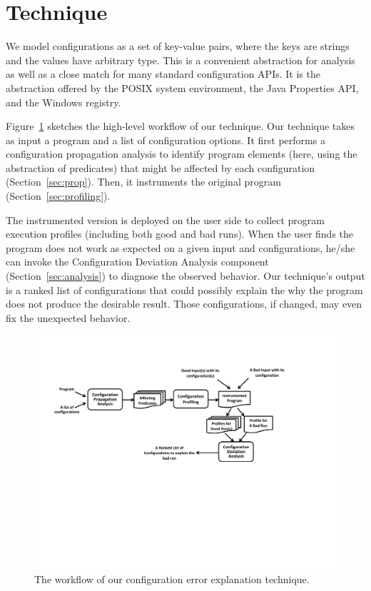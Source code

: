 \section{Technique}
\label{sec:technique}

We model configurations as a set of key-value pairs, where
the keys are strings and the values have arbitrary type. This is a
convenient abstraction for analysis as well as a close match for
many standard configuration APIs. It is the abstraction offered
by the POSIX system environment, the Java Properties API,
and the Windows registry.


Figure~\ref{fig:workflow} sketches the high-level workflow of our technique.
Our technique takes as input a program and a list of configuration options.
It first performs a configuration propagation analysis to identify
program elements (here, using the abstraction of predicates) that might be
affected by each configuration (Section~\ref{sec:prop}). Then, it
instruments the original program (Section~\ref{sec:profiling}).

The instrumented version is deployed on the user side to collect program execution
profiles (including both good and bad runs). When the user finds the program
does not work as expected on a given input and configurations,
he/she can invoke the Configuration Deviation Analysis component (Section~\ref{sec:analysis}) to
diagnose the observed behavior. Our technique's output is a ranked list of
configurations that could possibly explain the why the program does not produce the desirable result. Those
configurations, if changed, may even fix the unexpected behavior.

\begin{figure}[!]
  \centering
  \includegraphics[scale=0.750]{workflow}
  \vspace*{-2.0ex}\caption {{\label{fig:workflow} The workflow of our configuration error explanation technique.
}}
\end{figure}

